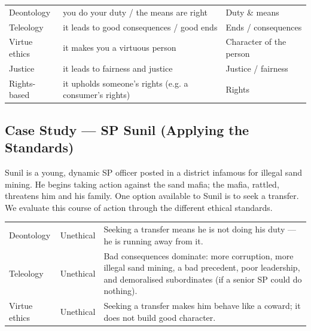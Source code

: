\begin{center}
\begin{tabularx}{\textwidth}{>{\raggedright\arraybackslash}p{2.6cm} Y >{\raggedright\arraybackslash}p{2.6cm}}
 &  &  \\
\toprule
Deontology & you do your duty / the means are right & Duty \& means \\
Teleology & it leads to good consequences / good ends & Ends / consequences \\
Virtue ethics & it makes you a virtuous person & Character of the person \\
Justice & it leads to fairness and justice & Justice / fairness \\
Rights-based & it upholds someone's rights (e.g. a consumer's rights) & Rights \\
\bottomrule
\end{tabularx}
\end{center}

\subsection{Case Study --- SP Sunil (Applying the Standards)}

\begin{ExampleBox}
Sunil is a young, dynamic SP officer posted in a district infamous for illegal sand mining. He begins taking action against the sand mafia; the mafia, rattled, threatens him and his family. One option available to Sunil is to seek a transfer. We evaluate this course of action through the different ethical standards.
\end{ExampleBox}

\begin{center}
\begin{tabularx}{\textwidth}{>{\raggedright\arraybackslash}p{2.4cm} >{\raggedright\arraybackslash}p{2.0cm} Y}
 &  &  \\
\toprule
Deontology & Unethical & Seeking a transfer means he is not doing his duty --- he is running away from it. \\
Teleology & Unethical & Bad consequences dominate: more corruption, more illegal sand mining, a bad precedent, poor leadership, and demoralised subordinates (if a senior SP could do nothing). \\
Virtue ethics & Unethical & Seeking a transfer makes him behave like a coward; it does not build good character. \\
\bottomrule
\end{tabularx}
\end{center}

